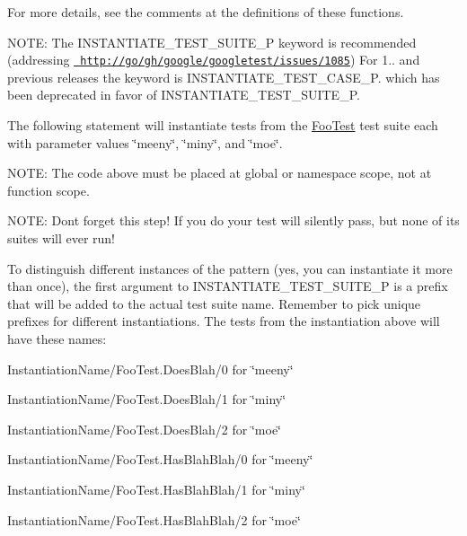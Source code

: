 For more details, see the comments at the definitions of these functions.

N\+O\+TE\+: The {\ttfamily I\+N\+S\+T\+A\+N\+T\+I\+A\+T\+E\+\_\+\+T\+E\+S\+T\+\_\+\+S\+U\+I\+T\+E\+\_\+P} keyword is recommended (addressing \href{http://go/gh/google/googletest/issues/1085}{\texttt{ http\+://go/gh/google/googletest/issues/1085}}) For 1.. and previous releases the keyword is {\ttfamily I\+N\+S\+T\+A\+N\+T\+I\+A\+T\+E\+\_\+\+T\+E\+S\+T\+\_\+\+C\+A\+S\+E\+\_\+P}. which has been deprecated in favor of I\+N\+S\+T\+A\+N\+T\+I\+A\+T\+E\+\_\+\+T\+E\+S\+T\+\_\+\+S\+U\+I\+T\+E\+\_\+P.

The following statement will instantiate tests from the {\ttfamily \mbox{\hyperlink{class_foo_test}{Foo\+Test}}} test suite each with parameter values {\ttfamily \char`\"{}meeny\char`\"{}}, {\ttfamily \char`\"{}miny\char`\"{}}, and {\ttfamily \char`\"{}moe\char`\"{}}.


\begin{DoxyCode}{0}
\end{DoxyCode}


N\+O\+TE\+: The code above must be placed at global or namespace scope, not at function scope.

N\+O\+TE\+: Don\textquotesingle{}t forget this step! If you do your test will silently pass, but none of its suites will ever run!

To distinguish different instances of the pattern (yes, you can instantiate it more than once), the first argument to {\ttfamily I\+N\+S\+T\+A\+N\+T\+I\+A\+T\+E\+\_\+\+T\+E\+S\+T\+\_\+\+S\+U\+I\+T\+E\+\_\+P} is a prefix that will be added to the actual test suite name. Remember to pick unique prefixes for different instantiations. The tests from the instantiation above will have these names\+:


\begin{DoxyItemize}
\item {\ttfamily Instantiation\+Name/\+Foo\+Test.\+Does\+Blah/0} for {\ttfamily \char`\"{}meeny\char`\"{}}
\item {\ttfamily Instantiation\+Name/\+Foo\+Test.\+Does\+Blah/1} for {\ttfamily \char`\"{}miny\char`\"{}}
\item {\ttfamily Instantiation\+Name/\+Foo\+Test.\+Does\+Blah/2} for {\ttfamily \char`\"{}moe\char`\"{}}
\item {\ttfamily Instantiation\+Name/\+Foo\+Test.\+Has\+Blah\+Blah/0} for {\ttfamily \char`\"{}meeny\char`\"{}}
\item {\ttfamily Instantiation\+Name/\+Foo\+Test.\+Has\+Blah\+Blah/1} for {\ttfamily \char`\"{}miny\char`\"{}}
\item {\ttfamily Instantiation\+Name/\+Foo\+Test.\+Has\+Blah\+Blah/2} for {\ttfamily \char`\"{}moe\char`\"{}}
\end{DoxyItemize}


